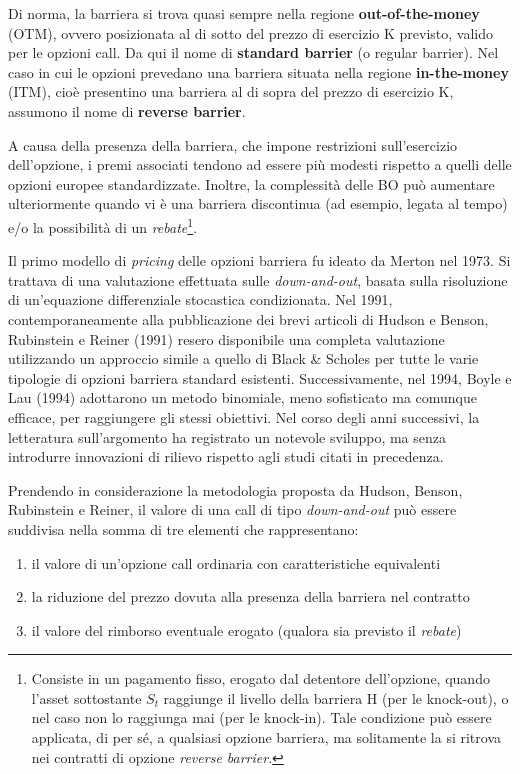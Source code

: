 \documentclass[12pt,a4paper]{report}
\begin{document}
Di norma, la barriera si trova quasi sempre nella regione \textbf{out-of-the-money} (OTM), ovvero posizionata al di sotto del prezzo di esercizio K previsto, valido per le opzioni call.  Da qui il nome di \textbf{standard barrier} (o regular barrier). Nel caso in cui le opzioni prevedano una barriera situata nella regione \textbf{in-the-money} (ITM), cioè presentino una barriera al di sopra del prezzo di esercizio K, assumono il nome di \textbf{reverse barrier}. 

A causa della presenza della barriera, che impone restrizioni sull'esercizio dell'opzione, i premi associati tendono ad essere più modesti rispetto a quelli delle opzioni europee standardizzate. Inoltre, la complessità delle BO può aumentare ulteriormente quando vi è una barriera discontinua (ad esempio, legata al tempo) e/o la possibilità di un \textit{rebate}\footnote{Consiste in un pagamento fisso, erogato dal detentore dell'opzione, quando l'asset sottostante $S_t$ raggiunge il livello della barriera H (per le knock-out), o nel caso non lo raggiunga mai (per le knock-in). Tale condizione può essere applicata, di per sé, a qualsiasi opzione barriera, ma solitamente la si ritrova nei contratti di opzione \textit{reverse barrier}.}. 

Il primo modello di \textit{pricing} delle opzioni barriera fu ideato da Merton nel 1973. Si trattava di una valutazione effettuata sulle \textit{down-and-out}, basata sulla risoluzione di un'equazione differenziale stocastica condizionata. Nel 1991, contemporaneamente alla pubblicazione dei brevi articoli di Hudson e Benson, Rubinstein e Reiner (1991) resero disponibile una completa valutazione utilizzando un approccio simile a quello di Black \& Scholes per tutte le varie tipologie di opzioni barriera standard esistenti. Successivamente, nel 1994, Boyle e Lau (1994) adottarono un metodo binomiale, meno sofisticato ma comunque efficace, per raggiungere gli stessi obiettivi. Nel corso degli anni successivi, la letteratura sull'argomento ha registrato un notevole sviluppo, ma senza introdurre innovazioni di rilievo rispetto agli studi citati in precedenza. 

Prendendo in considerazione la metodologia proposta da Hudson, Benson, Rubinstein e Reiner, il valore di una call di tipo \textit{down-and-out} può essere suddivisa nella somma di tre elementi che rappresentano:

\begin{enumerate}
    \item il valore di un'opzione call ordinaria con caratteristiche equivalenti
    \item la riduzione del prezzo dovuta alla presenza della barriera nel contratto
    \item il valore del rimborso eventuale erogato (qualora sia previsto il \textit{rebate})
\end{enumerate}
\end{document}
